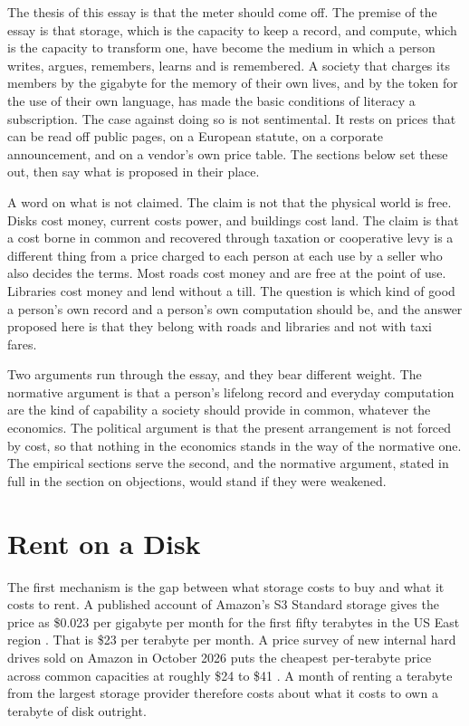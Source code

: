 \documentclass[11pt]{article}
\begin{document}
The thesis of this essay is that the meter should come off. The premise of the essay is that storage, which is the capacity to keep a record, and compute, which is the capacity to transform one, have become the medium in which a person writes, argues, remembers, learns and is remembered. A society that charges its members by the gigabyte for the memory of their own lives, and by the token for the use of their own language, has made the basic conditions of literacy a subscription. The case against doing so is not sentimental. It rests on prices that can be read off public pages, on a European statute, on a corporate announcement, and on a vendor's own price table. The sections below set these out, then say what is proposed in their place.

A word on what is not claimed. The claim is not that the physical world is free. Disks cost money, current costs power, and buildings cost land. The claim is that a cost borne in common and recovered through taxation or cooperative levy is a different thing from a price charged to each person at each use by a seller who also decides the terms. Most roads cost money and are free at the point of use. Libraries cost money and lend without a till. The question is which kind of good a person's own record and a person's own computation should be, and the answer proposed here is that they belong with roads and libraries and not with taxi fares.

Two arguments run through the essay, and they bear different weight. The normative argument is that a person's lifelong record and everyday computation are the kind of capability a society should provide in common, whatever the economics. The political argument is that the present arrangement is not forced by cost, so that nothing in the economics stands in the way of the normative one. The empirical sections serve the second, and the normative argument, stated in full in the section on objections, would stand if they were weakened.

\section{Rent on a Disk}\label{sec:rent}

The first mechanism is the gap between what storage costs to buy and what it costs to rent. A published account of Amazon's S3 Standard storage gives the price as \$0.023 per gigabyte per month for the first fifty terabytes in the US East region \cite{filebase}. That is \$23 per terabyte per month. A price survey of new internal hard drives sold on Amazon in October 2026 puts the cheapest per-terabyte price across common capacities at roughly \$24 to \$41 \cite{hddhunt}. A month of renting a terabyte from the largest storage provider therefore costs about what it costs to own a terabyte of disk outright.
\end{document}
